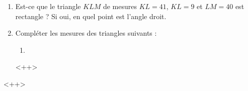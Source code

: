 
\begin{exercice}\label{exosmath-0963}

    \begin{enumerate}
        \item
            Est-ce que le triangle \( KLM\) de mesures \( KL=41\), \( KL=9\) et \( LM=40\) est rectangle ? Si oui, en quel point est l'angle droit.
        \item
            Compléter les mesures des triangles suivants :
            \begin{enumerate}
                \item
                    
            \end{enumerate}
            <++>
    \end{enumerate}
    <++>

\end{exercice}
